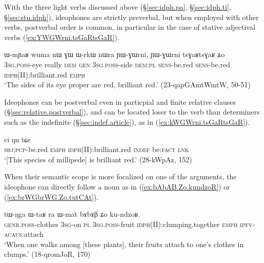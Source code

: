 With the three light verbs discussed above (§\ref{sec:idph.pa}, §\ref{sec:idph.ti}, §\ref{sec:stu.idph}), ideophones are strictly preverbal, but when employed with other verbs, postverbal order is common, in particular in the case of stative adjectival verbs (\ref{ex:YWGWrni.tsGaRtsGaR}).

\begin{exe}
\ex \label{ex:YWGWrni.tsGaRtsGaR}
\gll ɯ-mɲaʁ wuma nɯ ɣɯ ɯ-rkɯ nɯra ɲɯ-ɣɯrni, ɲɯ-ɣɯrni tsɣaʁtsɣaʁ ʑo \\
\textsc{3sg}.\textsc{poss}-eye really \textsc{dem} \textsc{gen} \textsc{3sg}.\textsc{poss}-side \textsc{dem}:\textsc{pl} \textsc{sens}-be.red  \textsc{sens}-be.red \textsc{idph}(II):brilliant.red \textsc{emph} \\
 \glt `The sides of its eye proper are red, brilliant red.'  (23-qapGAmtWmtW, 50-51)
 \end{exe}

Ideophones can be postverbal even in particpial and finite relative clauses (§\ref{sec:relative.postverbal}), and can be located loser to the verb than determiners such as the indefinite  (§\ref{sec:indef.article}), as in (\ref{ex:kWGWrni.tsGaRtsGaR}).

 \begin{exe}
\ex \label{ex:kWGWrni.tsGaRtsGaR}
 ci ŋu tɕe \\
\textsc{sbj}:\textsc{pcp}-be.red \textsc{emph} \textsc{idph}(II):brilliant.red \textsc{indef} be:\textsc{fact} \textsc{lnk} \\
\glt `[This species of millipede] is brilliant red.' (28-kWpAz, 152)
   \end{exe} 
   
 When their semantic scope is more focalized on one of the arguments, the ideophone can directly follow a noun as in (\ref{ex:bAbAB.Zo.kundzoR}) or (\ref{ex:brWGbrWG.Zo.tutCAt}).

\begin{exe}
\ex \label{ex:bAbAB.Zo.kundzoR}
\gll tɯ-ŋga ɯ-taʁ ra ɯ-mat bɤbɤβ ʑo ku-ndzoʁ. \\
\textsc{genr}.\textsc{poss}-clothes \textsc{3sg}-on \textsc{pl}  \textsc{3sg}.\textsc{poss}-fruit \textsc{idph}(II):clumping.together \textsc{emph} \textsc{ipfv}-\textsc{acaus}:attach \\
\glt `When one walks among [these plants], their fruits attach to one's clothes in clumps.' (18-qromJoR, 170)
\end{exe}

